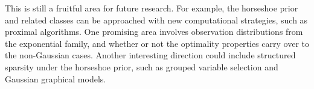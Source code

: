 \documentclass[11pt]{article}
\begin{document}
This is still a fruitful area for future research.  For example, the horseshoe
prior and related classes can be approached with new computational strategies,
such as proximal algorithms.  One promising area involves observation
distributions from the exponential family, and whether or not the optimality
properties carry over to the non-Gaussian cases.  Another interesting direction
could include structured sparsity under the horseshoe prior, such as grouped
variable selection and Gaussian graphical models. 


\end{document}
